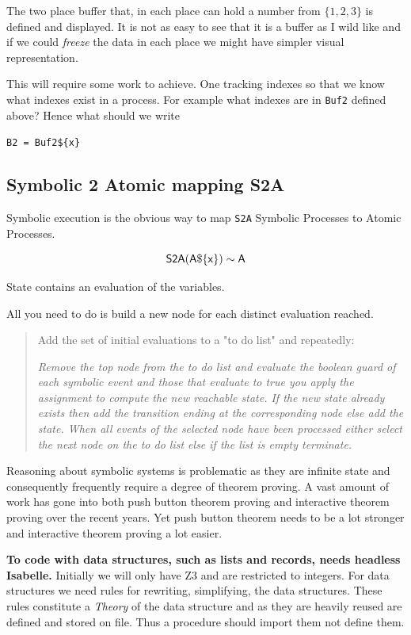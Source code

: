 \documentclass[]{article}
\begin{document}
{The two place buffer that, in each place can hold a number from $\{1,2,3\}$ is defined and displayed.  It is not as easy to see that it is a buffer as I wild like and if we could \emph{freeze} the data in each place we might have simpler visual representation.


This will require some work to achieve.  One tracking  indexes so that we know what indexes exist in a process. For example what indexes are in \verb|Buf2| defined above? Hence what should we write

\verb|B2 = Buf2${x}|
}



\subsection{Symbolic 2 Atomic mapping S2A}
Symbolic execution  is the obvious way  to  map \verb|S2A|  Symbolic Processes  to  Atomic Processes.

\[{\sf S2A(A\$\{x\})\sim  A }\]

State contains  an evaluation of the variables.


All you need to do is build a new node for each distinct evaluation reached.

 \begin{quote}
 Add  the set of initial evaluations to a "to do list" and repeatedly:

 \emph{Remove the top node from the to do list and evaluate the boolean guard of each  symbolic event and those that evaluate to true you apply the assignment to compute the new reachable state. If the new state already exists then add the transition ending at the corresponding  node else add the state.  When  all events of the selected node have been processed either select the next node on the to do list else if the list is empty terminate.  }
 \end{quote}




Reasoning about symbolic systems is problematic as they are infinite state and consequently frequently require a degree of theorem proving. A vast amount of work has gone into both push button theorem proving and interactive theorem proving over the recent years.  Yet push button theorem needs to be a lot stronger and interactive theorem proving a lot easier.

{\bf To code with data structures, such as lists and records,  needs headless Isabelle.}  Initially we will only have Z3 and are restricted to integers.  For data structures  we need rules for rewriting, simplifying, the data structures. These rules constitute a \emph{Theory} of the data structure and as they are heavily reused are defined and stored on file. Thus a procedure should import them  not define them.
\end{document}
